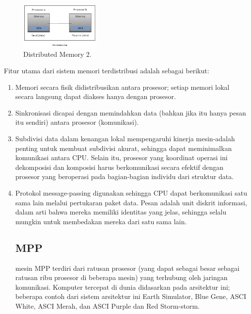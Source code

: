 \begin{figure}[H]
	\includegraphics[width=4cm]{figures/kelompok2/chapter1/9.png}
	\centering
	\caption{Distributed Memory 2.}
\end{figure}

\noindent
Fitur utama dari sistem memori terdistribusi adalah sebagai berikut:

\begin{enumerate}
	\item Memori secara fisik didistribusikan antara prosesor; setiap memori lokal secara langsung dapat diakses hanya dengan prosesor.
	\item Sinkronisasi dicapai dengan memindahkan data (bahkan jika itu hanya pesan itu sendiri) antara prosesor (komunikasi).
	\item Subdivisi data dalam kenangan lokal mempengaruhi kinerja mesin-adalah penting untuk membuat subdivisi akurat, sehingga dapat meminimalkan komunikasi antara CPU. Selain itu, prosesor yang koordinat operasi ini dekomposisi dan komposisi harus berkomunikasi secara efektif dengan prosesor yang beroperasi pada bagian-bagian individu dari struktur data.
         \item Protokol message-passing digunakan sehingga CPU dapat berkomunikasi satu sama lain melalui pertukaran paket data. Pesan adalah unit diskrit informasi, dalam arti bahwa mereka memiliki identitas yang jelas, sehingga selalu mungkin untuk membedakan mereka dari satu sama lain.


\subsection{MPP}
mesin MPP terdiri dari ratusan prosesor (yang dapat sebagai besar sebagai ratusan ribu prosesor di beberapa mesin) yang terhubung oleh jaringan komunikasi. Komputer tercepat di dunia didasarkan pada arsitektur ini; beberapa contoh dari sistem arsitektur ini Earth Simulator, Blue Gene, ASCI White, ASCI Merah, dan ASCI Purple dan Red Storm-storm.


\end{enumerate}
